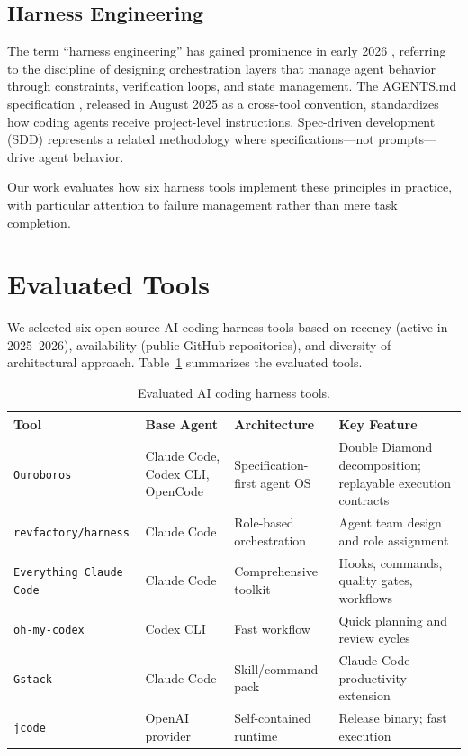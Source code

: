 \documentclass[11pt,a4paper]{article}
\newcommand{\tool}[1]{\texttt{#1}}
\begin{document}
\subsection{Harness Engineering}

The term ``harness engineering'' has gained prominence in early 2026 \cite{augment2026harness, openai2026agents}, referring to the discipline of designing orchestration layers that manage agent behavior through constraints, verification loops, and state management.
The AGENTS.md specification \cite{agentsmd2025}, released in August 2025 as a cross-tool convention, standardizes how coding agents receive project-level instructions.
Spec-driven development (SDD) \cite{github2025speckit} represents a related methodology where specifications---not prompts---drive agent behavior.

Our work evaluates how six harness tools implement these principles in practice, with particular attention to failure management rather than mere task completion.

\section{Evaluated Tools}
\label{sec:tools}

We selected six open-source AI coding harness tools based on recency (active in 2025--2026), availability (public GitHub repositories), and diversity of architectural approach.
Table~\ref{tab:tools} summarizes the evaluated tools.

\begin{table}[t]
\centering
\caption{Evaluated AI coding harness tools.}
\label{tab:tools}
\small
\begin{tabular}{@{}p{2.8cm}p{2.5cm}p{3.0cm}p{4.5cm}@{}}
\toprule
\textbf{Tool} & \textbf{Base Agent} & \textbf{Architecture} & \textbf{Key Feature} \\
\midrule
\tool{Ouroboros} \cite{ouroboros2026} & Claude Code, Codex CLI, OpenCode & Specification-first agent OS & Double Diamond decomposition; replayable execution contracts \\
\tool{revfactory/harness} \cite{revfactory2026} & Claude Code & Role-based orchestration & Agent team design and role assignment \\
\tool{Everything Claude Code} \cite{ecc2026} & Claude Code & Comprehensive toolkit & Hooks, commands, quality gates, workflows \\
\tool{oh-my-codex} \cite{ohmycodex2026} & Codex CLI & Fast workflow & Quick planning and review cycles \\
\tool{Gstack} \cite{gstack2026} & Claude Code & Skill/command pack & Claude Code productivity extension \\
\tool{jcode} \cite{jcode2026} & OpenAI provider & Self-contained runtime & Release binary; fast execution \\
\bottomrule
\end{tabular}
\end{table}
\end{document}
